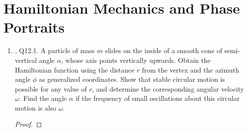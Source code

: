 \documentclass[../psets.tex]{subfiles}
\begin{document}
\section{Hamiltonian Mechanics and Phase Portraits}
\begin{enumerate}
    \item {}\textcite{bib:KibbleBerkshire}, Q12.1. A particle of mass $m$ slides on the inside of a smooth cone of semi-vertical angle $\alpha$, whose axis points vertically upwards. Obtain the Hamiltonian function using the distance $r$ from the vertex and the azimuth angle $\phi$ as generalized coordinates. Show that stable circular motion is possible for any value of $r$, and determine the corresponding angular velocity $\omega$. Find the angle $\alpha$ if the frequency of small oscillations about this circular motion is also $\omega$.
    \begin{proof}


\end{proof}
\end{enumerate}
\end{document}
